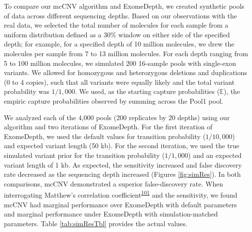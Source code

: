 \documentclass[11pt,letterpaper]{book}
\begin{document}
To compare our mcCNV algorithm and ExomeDepth, we created synthetic pools of data across different sequencing depths.
Based on our observations with the real data, we selected the total number of molecules for each sample from a uniform distribution defined as a 30\% window on either side of the specified depth; for example, for a specified depth of 10 million molecules, we drew the molecules per sample from 7 to 13 million molecules.
For each depth ranging from 5 to 100 million molecules, we simulated 200 16-sample pools with single-exon variants.
We allowed for homozygous and heterozygous deletions and duplications (0 to 4 copies), such that all variants were equally likely and the total variant probability was \(1/1,000\).
We used, as the starting capture probabilities (\(\mathbb{E}\)), the empiric capture probabilities observed by summing across the Pool1 pool.

We analyzed each of the 4,000 pools (200 replicates by 20 depths) using our algorithm and two iterations of ExomeDepth.
For the first iteration of ExomeDepth, we used the default values for transition probability (\(1/10,000\)) and expected variant length (50 kb).
For the second iteration, we used the true simulated variant prior for the transition probability (\(1/1,000\)) and an expected variant length of 1 kb.
As expected, the sensitivity increased and false discovery rate decreased as the sequencing depth increased (Figures \ref{fig:simRes}).
In both comparisons, mcCNV demonstrated a superior false-discovery rate.
When interrogating Matthew's correlation coefficient\textsuperscript{\protect\hyperlink{ref-matthews:1975aa}{101}} and the sensitivity, we found mcCNV had marginal performance over ExomeDepth with default parameters and marginal performance under ExomeDepth with simulation-matched parameters. Table \ref{tab:simResTbl} provides the actual values.
\end{document}
